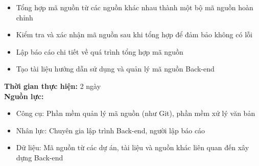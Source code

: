 {\begin{minipage}{\textwidth}
\begin{itemize}
        \item Tổng hợp mã nguồn từ các nguồn khác nhau thành một bộ mã nguồn hoàn chỉnh
        \item Kiểm tra và xác nhận mã nguồn sau khi tổng hợp để đảm bảo không có lỗi
        \item Lập báo cáo chi tiết về quá trình tổng hợp mã nguồn
        \item Tạo tài liệu hướng dẫn sử dụng và quản lý mã nguồn Back-end
    \end{itemize}
    \noindent \textbf{Thời gian thực hiện:} 2 ngày \\
    \noindent \textbf{Nguồn lực:}
    \begin{itemize}
        \item Công cụ: Phần mềm quản lý mã nguồn (như Git), phần mềm xử lý văn bản
        \item Nhân lực: Chuyên gia lập trình Back-end, người lập báo cáo
        \item Dữ liệu: Mã nguồn từ các dự án, tài liệu và nguồn khác liên quan đến xây dựng Back-end
    \end{itemize}
    \end{minipage}
}
\newpage
{}    

